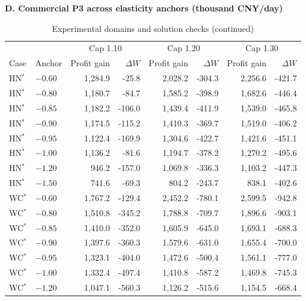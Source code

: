 \begin{table}[p]\ContinuedFloat\centering
\caption[]{Experimental domains and solution checks (continued)}
\begin{minipage}{.95\textwidth}\fontsize{8}{10}\selectfont{}\setlength{\tabcolsep}{3pt}\renewcommand{\arraystretch}{1.10}
\par\noindent\textbf{D. Commercial P3 across elasticity anchors (thousand CNY/day)}\par\smallskip
\begin{tabular*}{\linewidth}{@{\extracolsep{\fill}}llrrrrrr@{}}\toprule
& & \multicolumn{2}{c}{Cap 1.10} & \multicolumn{2}{c}{Cap 1.20} & \multicolumn{2}{c}{Cap 1.30} \\
Case & Anchor & Profit gain & $\Delta W$ & Profit gain & $\Delta W$ & Profit gain & $\Delta W$ \\
\midrule
HN$^{*}$ & $-0.60$ & 1,284.9 & -25.8 & 2,028.2 & -304.3 & 2,256.6 & -421.7 \\
HN$^{*}$ & $-0.80$ & 1,180.7 & -84.7 & 1,585.2 & -398.9 & 1,682.6 & -446.4 \\
HN$^{*}$ & $-0.85$ & 1,182.2 & -106.0 & 1,439.4 & -411.9 & 1,539.0 & -465.8 \\
HN$^{*}$ & $-0.90$ & 1,174.5 & -115.2 & 1,410.3 & -369.7 & 1,519.0 & -406.2 \\
HN$^{*}$ & $-0.95$ & 1,122.4 & -169.9 & 1,304.6 & -422.7 & 1,421.6 & -451.1 \\
HN$^{*}$ & $-1.00$ & 1,136.2 & -81.6 & 1,194.7 & -378.2 & 1,270.2 & -495.6 \\
HN$^{*}$ & $-1.20$ & 946.2 & -157.0 & 1,069.8 & -336.3 & 1,103.2 & -447.3 \\
HN$^{*}$ & $-1.50$ & 741.6 & -69.3 & 804.2 & -243.7 & 838.1 & -402.6 \\
\addlinespace
WC$^{*}$ & $-0.60$ & 1,767.2 & -129.4 & 2,452.2 & -780.1 & 2,599.5 & -942.8 \\
WC$^{*}$ & $-0.80$ & 1,510.8 & -345.2 & 1,788.8 & -709.7 & 1,896.6 & -903.1 \\
WC$^{*}$ & $-0.85$ & 1,410.0 & -352.0 & 1,605.9 & -645.0 & 1,693.1 & -688.3 \\
WC$^{*}$ & $-0.90$ & 1,397.6 & -360.3 & 1,579.6 & -631.0 & 1,655.4 & -700.0 \\
WC$^{*}$ & $-0.95$ & 1,323.1 & -404.0 & 1,472.6 & -500.4 & 1,561.1 & -777.0 \\
WC$^{*}$ & $-1.00$ & 1,332.4 & -497.4 & 1,410.8 & -587.2 & 1,469.8 & -745.3 \\
WC$^{*}$ & $-1.20$ & 1,047.1 & -560.3 & 1,126.2 & -515.6 & 1,154.5 & -668.4 \\

\end{tabular*}
\end{minipage}
\end{table}
